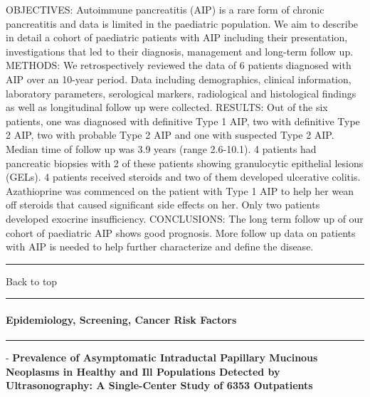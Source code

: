 \documentclass[]{article}
\let\oldparagraph\paragraph
\renewcommand{\paragraph}[1]{\oldparagraph{#1}\mbox{}}
\begin{document}
OBJECTIVES: Autoimmune pancreatitis (AIP) is a rare form of chronic
pancreatitis and data is limited in the paediatric population. We aim to
describe in detail a cohort of paediatric patients with AIP including
their presentation, investigations that led to their diagnosis,
management and long-term follow up. METHODS: We retrospectively reviewed
the data of 6 patients diagnosed with AIP over an 10-year period. Data
including demographics, clinical information, laboratory parameters,
serological markers, radiological and histological findings as well as
longitudinal follow up were collected. RESULTS: Out of the six patients,
one was diagnosed with definitive Type 1 AIP, two with definitive Type 2
AIP, two with probable Type 2 AIP and one with suspected Type 2 AIP.
Median time of follow up was 3.9 years (range 2.6-10.1). 4 patients had
pancreatic biopsies with 2 of these patients showing granulocytic
epithelial lesions (GELs). 4 patients received steroids and two of them
developed ulcerative colitis. Azathioprine was commenced on the patient
with Type 1 AIP to help her wean off steroids that caused significant
side effects on her. Only two patients developed exocrine insufficiency.
CONCLUSIONS: The long term follow up of our cohort of paediatric AIP
shows good prognosis. More follow up data on patients with AIP is needed
to help further characterize and define the disease.

{}

{}

\begin{center}\rule{0.5\linewidth}{\linethickness}\end{center}

Back to top

\begin{center}\rule{0.5\linewidth}{\linethickness}\end{center}

\pagebreak

\hypertarget{epidemiology-screening-cancer-risk-factors}{%
\paragraph{Epidemiology, Screening, Cancer Risk
Factors}\label{epidemiology-screening-cancer-risk-factors}}

\begin{center}\rule{0.5\linewidth}{\linethickness}\end{center}

 - \textbf{Prevalence of Asymptomatic Intraductal Papillary Mucinous
Neoplasms in Healthy and Ill Populations Detected by Ultrasonography: A
Single-Center Study of 6353 Outpatients}
\end{document}
